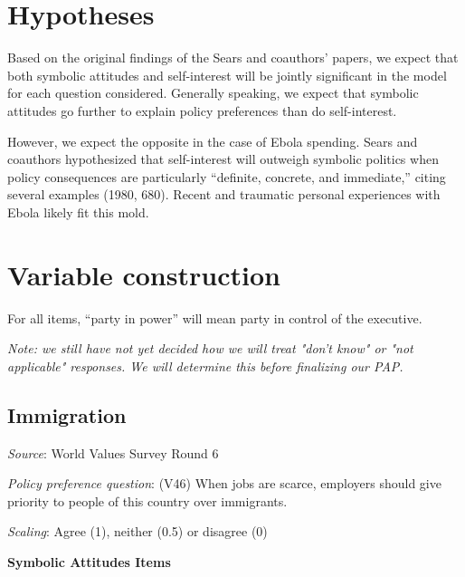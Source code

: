 \documentclass[]{article}
\begin{document}
\section{Hypotheses}\label{hypotheses}

Based on the original findings of the Sears and coauthors' papers, we
expect that both symbolic attitudes and self-interest will be jointly
significant in the model for each question considered. Generally
speaking, we expect that symbolic attitudes go further to explain policy
preferences than do self-interest.

However, we expect the opposite in the case of Ebola spending. Sears and
coauthors hypothesized that self-interest will outweigh symbolic
politics when policy consequences are particularly ``definite, concrete,
and immediate,'' citing several examples (1980, 680). Recent and
traumatic personal experiences with Ebola likely fit this mold.

\section{Variable construction}\label{variable-construction}

For all items, ``party in power'' will mean party in control of the
executive.

\textit{Note: we still have not yet decided how we will treat "don't know" or "not applicable" responses. We will determine this before finalizing our PAP.}

\subsection{Immigration}\label{immigration}

\textit{Source}: World Values Survey Round 6

\textit{Policy preference question}: (V46) When jobs are scarce,
employers should give priority to people of this country over
immigrants.

\textit{Scaling}: Agree (1), neither (0.5) or disagree (0)

\textbf{Symbolic Attitudes Items}
\end{document}
